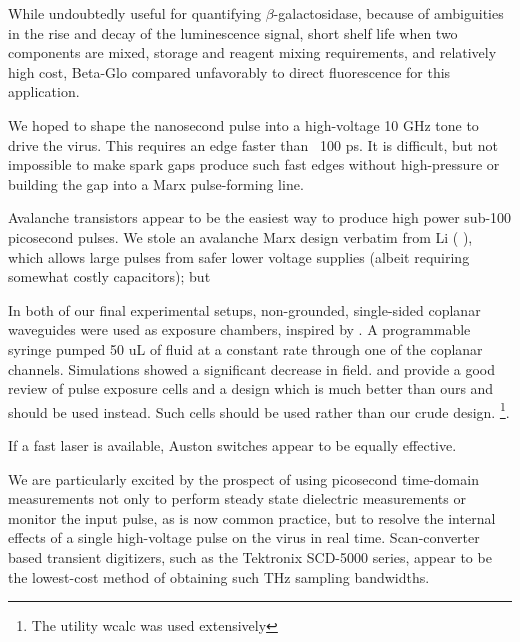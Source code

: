 \documentclass[paper.tex]{subfiles}
\begin{document}
While undoubtedly useful for quantifying $\beta$-galactosidase, because of ambiguities in the rise and decay of the luminescence signal, short shelf life when two components are mixed, storage and reagent mixing requirements, and relatively high cost, Beta-Glo compared unfavorably to direct fluorescence for this application.


We hoped to shape the nanosecond pulse into a high-voltage 10 GHz tone to drive the virus. This requires an edge faster than ~100 ps. It is difficult, but not impossible\cite{Fundamental1998} to make spark gaps produce such fast edges without high-pressure\cite{Design2007d}\cite{Picosecond1993} or building the gap into a Marx\cite{Simple1991} pulse-forming line. 

Avalanche transistors appear to be the easiest way to produce high power sub-100 picosecond pulses. We stole an avalanche Marx design verbatim from Li (\cite{Development2016b} \cite{Design2018c}), which allows large pulses from safer lower voltage supplies (albeit requiring somewhat costly capacitors); but 

In both of our final experimental setups, non-grounded, single-sided coplanar waveguides were used as exposure chambers, inspired by \cite{Microwave2007}. A programmable syringe pumped 50 uL of fluid at a constant rate through one of the coplanar channels. Simulations showed a significant decrease in field. \cite{Microchamber2011} and \cite{Characterization2012} provide a good review of pulse exposure cells and a design which is much better than ours and should be used instead. Such cells should be used rather than our crude design. \footnote{The utility wcalc was used extensively}.

If a fast laser is available, Auston switches appear to be equally effective.

We are particularly excited by the prospect of using picosecond time-domain measurements not only to perform steady state dielectric measurements or monitor the input pulse, as is now common practice, but to resolve the internal effects of a single high-voltage pulse on the virus in real time. Scan-converter based transient digitizers, such as the Tektronix SCD-5000 series, appear to be the lowest-cost method of obtaining such THz sampling bandwidths. 

\end{document}
